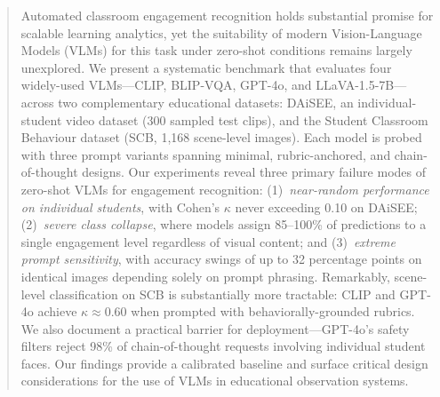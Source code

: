 \begin{abstract}
Automated classroom engagement recognition holds substantial promise for
scalable learning analytics, yet the suitability of modern
Vision-Language Models (VLMs) for this task under zero-shot conditions
remains largely unexplored.  We present a systematic benchmark that
evaluates four widely-used VLMs---CLIP, BLIP-VQA, GPT-4o, and
LLaVA-1.5-7B---across two complementary educational datasets: DAiSEE,
an individual-student video dataset (300 sampled test clips), and the
Student Classroom Behaviour dataset (SCB, 1{,}168 scene-level images).
Each model is probed with three prompt variants spanning minimal,
rubric-anchored, and chain-of-thought designs.  Our experiments reveal
three primary failure modes of zero-shot VLMs for engagement recognition:
(1)~\emph{near-random performance on individual students}, with Cohen's
$\kappa$ never exceeding 0.10 on DAiSEE; (2)~\emph{severe class
collapse}, where models assign 85--100\% of predictions to a single
engagement level regardless of visual content; and (3)~\emph{extreme
prompt sensitivity}, with accuracy swings of up to 32 percentage points
on identical images depending solely on prompt phrasing.  Remarkably,
scene-level classification on SCB is substantially more tractable:
CLIP and GPT-4o achieve $\kappa \approx 0.60$ when prompted with
behaviorally-grounded rubrics.  We also document a practical barrier for
deployment---GPT-4o's safety filters reject 98\% of chain-of-thought
requests involving individual student faces.  Our findings provide a
calibrated baseline and surface critical design considerations for the
use of VLMs in educational observation systems.
\end{abstract}
